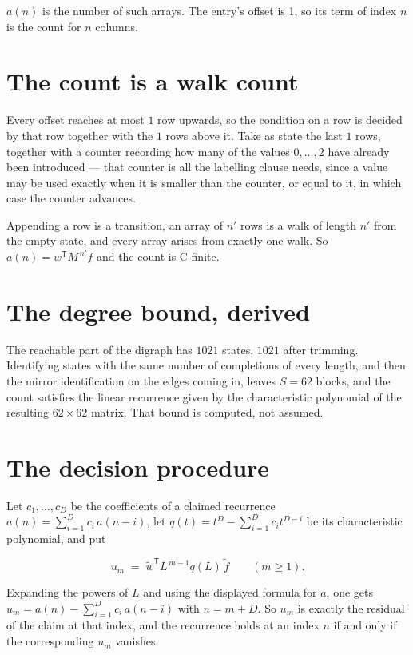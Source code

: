\documentclass[11pt]{article}
\theoremstyle{definition}
\begin{document}
$a(n)$ is the number of such arrays. The entry's offset is 1, so its term of index $n$ is the count for $n$ columns.

\section{The count is a walk count}

Every offset reaches at most $1$ row upwards, so the condition on a row is decided by that row together with the $1$ rows above it. Take as state the last $1$ rows, together with a counter recording how many of the values $0,\dots,2$ have already been introduced --- that counter is all the labelling clause needs, since a value may be used exactly when it is smaller than the counter, or equal to it, in which case the counter advances.

Appending a row is a transition, an array of $n'$ rows is a walk of length $n'$ from the empty state, and every array arises from exactly one walk. So $a(n) = w^{\mathsf T}M^{\,n'}f$ and the count is C-finite.

\section{The degree bound, derived}

The reachable part of the digraph has $1021$ states, $1021$ after trimming. Identifying states with the same number of completions of every length, and then the mirror identification on the edges coming in, leaves $S = 62$ blocks, and the count satisfies the linear recurrence given by the characteristic polynomial of the resulting $62\times62$ matrix. That bound is computed, not assumed.

\section{The decision procedure}

Let $c_1,\dots,c_D$ be the coefficients of a claimed recurrence $a(n) = \sum_{i=1}^{D} c_i\,a(n-i)$, let $q(t) = t^{D} - \sum_{i=1}^{D} c_i t^{D-i}$ be its characteristic polynomial, and put

\[u_m \;=\; \tilde w^{\mathsf T} L^{\,m-1} q(L)\,\tilde f \qquad (m \ge 1).\]

Expanding the powers of $L$ and using the displayed formula for $a$, one gets $u_m = a(n) - \sum_{i=1}^{D} c_i\,a(n-i)$ with $n = m + D$. So $u_m$ is exactly the residual of the claim at that index, and the recurrence holds at an index $n$ if and only if the corresponding $u_m$ vanishes.
\end{document}
